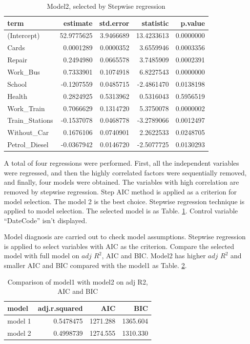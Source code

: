 \documentclass[
]{article}
\begin{document}
\begin{table}

\caption{\label{tab:unnamed-chunk-9}Model2, selected by Stepwise regression\label{tab:model2}}
\centering
\begin{tabular}[t]{l|r|r|r|r}
\hline
term & estimate & std.error & statistic & p.value\\
\hline
(Intercept) & 52.9775625 & 3.9466689 & 13.4233613 & 0.0000000\\
\hline
Cards & 0.0001289 & 0.0000352 & 3.6559946 & 0.0003356\\
\hline
Repair & 0.2494980 & 0.0665578 & 3.7485909 & 0.0002391\\
\hline
Work\_Bus & 0.7333901 & 0.1074918 & 6.8227543 & 0.0000000\\
\hline
School & -0.1207559 & 0.0485715 & -2.4861470 & 0.0138198\\
\hline
Health & 0.2824925 & 0.5313962 & 0.5316043 & 0.5956519\\
\hline
Work\_Train & 0.7066629 & 0.1314720 & 5.3750078 & 0.0000002\\
\hline
Train\_Stations & -0.1537078 & 0.0468778 & -3.2789066 & 0.0012497\\
\hline
Without\_Car & 0.1676106 & 0.0740901 & 2.2622533 & 0.0248705\\
\hline
Petrol\_Diesel & -0.0367942 & 0.0146720 & -2.5077725 & 0.0130293\\
\hline
\end{tabular}
\end{table}

A total of four regressions were performed. First, all the independent
variables were regressed, and then the highly correlated factors were
sequentially removed, and finally, four models were obtained. The
variables with high correlation are removed by stepwise regression. Step
AIC method is applied as a criterion for model selection. The model 2 is
the best choice. Stepwise regression technique is applied to model
selection. The selected model is as Table. \ref{tab:model2}. Control
variable ``DateCode'' isn't displayed.

Model diagnosis are carried out to check model assumptions. Stepwise
regression is applied to select variables with AIC as the criterion.
Compare the selected model with full model on \(adj\) \(R^2\), AIC and
BIC. Model2 has higher \(adj\) \(R^2\) and smaller AIC and BIC compared
with the model1 as Table. \ref{tab:com}.

\begin{table}

\caption{\label{tab:unnamed-chunk-10}Comparison of model1 with model2 on adj R2, AIC and BIC\label{tab:com}}
\centering
\begin{tabular}[t]{l|r|r|r}
\hline
model & adj.r.squared & AIC & BIC\\
\hline
model 1 & 0.5478475 & 1271.288 & 1365.604\\
\hline
model 2 & 0.4998739 & 1274.555 & 1310.330\\
\hline
\end{tabular}
\end{table}
\end{document}
